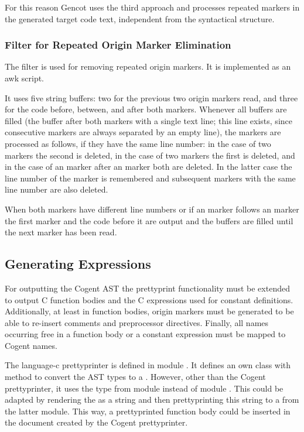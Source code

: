 For this reason Gencot uses the third approach and processes repeated markers in the generated target code text,
independent from the syntactical structure.

\subsubsection{Filter for Repeated Origin Marker Elimination}

The filter  is used for removing repeated origin markers. It is implemented as an awk script.

It uses five string buffers: two for the previous two origin markers read, and three for the code before,
between, and after both markers. Whenever all buffers are filled (the buffer after both markers with a 
single text line; this line exists, since consecutive markers are always separated by an empty line),
the markers are processed as follows, if they have the same line number: in the case of two 
 markers the second is deleted, in the
case of two  markers the first is deleted, and in the case of an 
marker after an  marker both are deleted. In the latter case the line number of the
 marker is remembered and subsequent  markers with the same line number
are also deleted.

When both markers have different line numbers or if an  marker follows an 
marker the first marker and the code before it are output and the buffers are filled until the next marker
has been read.

\subsection{Generating Expressions}
\label{impl-ccode-expr}

For outputting the Cogent AST the prettyprint functionality must be extended to 
output C function bodies and the C expressions used for constant definitions. Additionally, at least in function bodies,
origin markers must be generated to be able to re-insert comments and preprocessor directives. Finally, all names
occurring free in a function body or a constant expression must be mapped to Cogent names.

The language-c prettyprinter is defined in module . It defines an own class  with 
method  to convert the AST types to a . However, other than the Cogent prettyprinter, it uses 
the type  from module  instead of module .
This could be adapted by rendering the  as a string and then prettyprinting this string to a 
from the latter module. This way, a prettyprinted function body could be inserted in the document created by the
Cogent prettyprinter.

